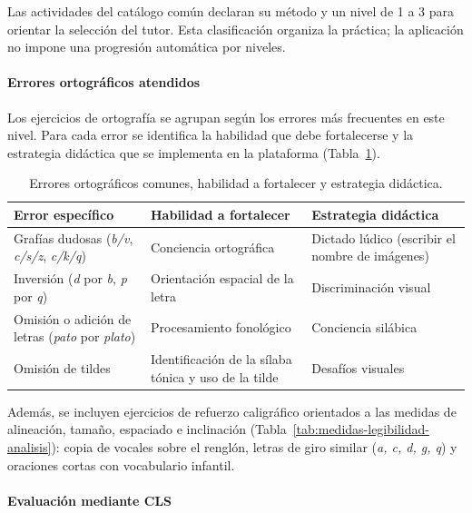 Las actividades del catálogo común declaran su método y un nivel de 1 a 3
para orientar la selección del tutor. Esta clasificación organiza la práctica;
la aplicación no impone una progresión automática por niveles.

\paragraph{Errores ortográficos atendidos}

Los ejercicios de ortografía se agrupan según los errores más frecuentes en
este nivel. Para cada error se identifica la habilidad que debe fortalecerse y
la estrategia didáctica que se implementa en la plataforma
(Tabla~\ref{tab:errores-estrategias}).

\begin{table}[H]
\centering
\caption{Errores ortográficos comunes, habilidad a fortalecer y estrategia didáctica.}
\label{tab:errores-estrategias}
\renewcommand{\arraystretch}{1.4}
\begin{tabular}{|p{4.2cm}|p{4.6cm}|p{5.2cm}|}
\hline
\textbf{Error específico} & \textbf{Habilidad a fortalecer} & \textbf{Estrategia didáctica} \\ \hline
Grafías dudosas (\textit{b/v}, \textit{c/s/z}, \textit{c/k/q}) & Conciencia ortográfica & Dictado lúdico (escribir el nombre de imágenes) \\ \hline
Inversión (\textit{d} por \textit{b}, \textit{p} por \textit{q}) & Orientación espacial de la letra & Discriminación visual \\ \hline
Omisión o adición de letras (\textit{pato} por \textit{plato}) & Procesamiento fonológico & Conciencia silábica \\ \hline
Omisión de tildes & Identificación de la sílaba tónica y uso de la tilde & Desafíos visuales \\ \hline
\end{tabular}
\end{table}

Además, se incluyen ejercicios de refuerzo caligráfico orientados a
las medidas de alineación, tamaño, espaciado e inclinación
(Tabla~\ref{tab:medidas-legibilidad-analisis}): copia de
vocales sobre el renglón, letras de giro similar (\textit{a, c, d, g, q}) y
oraciones cortas con vocabulario infantil.

\paragraph{Evaluación mediante CLS}

